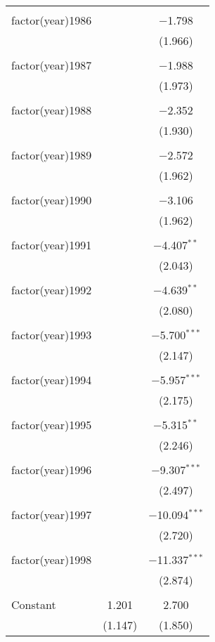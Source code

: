 \begin{table}[!htbp]
\begin{tabular}{@{\extracolsep{5pt}}lcc}
  & & \\ 
 factor(year)1986 &  & $-$1.798 \\ 
  &  & (1.966) \\ 
  & & \\ 
 factor(year)1987 &  & $-$1.988 \\ 
  &  & (1.973) \\ 
  & & \\ 
 factor(year)1988 &  & $-$2.352 \\ 
  &  & (1.930) \\ 
  & & \\ 
 factor(year)1989 &  & $-$2.572 \\ 
  &  & (1.962) \\ 
  & & \\ 
 factor(year)1990 &  & $-$3.106 \\ 
  &  & (1.962) \\ 
  & & \\ 
 factor(year)1991 &  & $-$4.407$^{**}$ \\ 
  &  & (2.043) \\ 
  & & \\ 
 factor(year)1992 &  & $-$4.639$^{**}$ \\ 
  &  & (2.080) \\ 
  & & \\ 
 factor(year)1993 &  & $-$5.700$^{***}$ \\ 
  &  & (2.147) \\ 
  & & \\ 
 factor(year)1994 &  & $-$5.957$^{***}$ \\ 
  &  & (2.175) \\ 
  & & \\ 
 factor(year)1995 &  & $-$5.315$^{**}$ \\ 
  &  & (2.246) \\ 
  & & \\ 
 factor(year)1996 &  & $-$9.307$^{***}$ \\ 
  &  & (2.497) \\ 
  & & \\ 
 factor(year)1997 &  & $-$10.094$^{***}$ \\ 
  &  & (2.720) \\ 
  & & \\ 
 factor(year)1998 &  & $-$11.337$^{***}$ \\ 
  &  & (2.874) \\ 
  & & \\ 
 Constant & 1.201 & 2.700 \\ 
  & (1.147) & (1.850) \\ 

\end{tabular}
\end{table}
